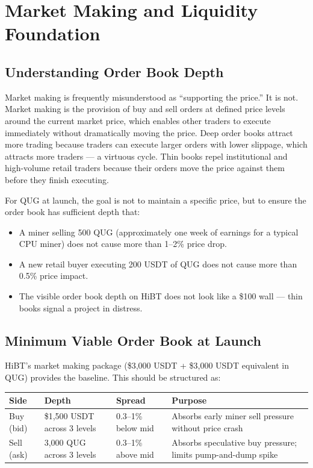 \documentclass[11pt,a4paper]{article}
\begin{document}
\section{Market Making and Liquidity Foundation}

\subsection{Understanding Order Book Depth}

Market making is frequently misunderstood as ``supporting the price.'' It is not. Market making is the provision of buy and sell orders at defined price levels around the current market price, which enables other traders to execute immediately without dramatically moving the price. Deep order books attract more trading because traders can execute larger orders with lower slippage, which attracts more traders — a virtuous cycle. Thin books repel institutional and high-volume retail traders because their orders move the price against them before they finish executing.

For QUG at launch, the goal is not to maintain a specific price, but to ensure the order book has sufficient depth that:
\begin{itemize}[leftmargin=1.5em, itemsep=2pt]
  \item A miner selling 500 QUG (approximately one week of earnings for a typical CPU miner) does not cause more than 1--2\% price drop.
  \item A new retail buyer executing 200 USDT of QUG does not cause more than 0.5\% price impact.
  \item The visible order book depth on HiBT does not look like a \$100 wall — thin books signal a project in distress.
\end{itemize}

\subsection{Minimum Viable Order Book at Launch}

HiBT's market making package (\$3,000 USDT + \$3,000 USDT equivalent in QUG) provides the baseline. This should be structured as:

\begin{center}
\begin{tabular}{C{2cm} C{2.5cm} C{2.5cm} L{5.5cm}}
  \toprule
  \textbf{Side} & \textbf{Depth} & \textbf{Spread} & \textbf{Purpose} \\
  \midrule
  Buy (bid) & \$1,500 USDT across 3 levels & 0.3--1\% below mid & Absorbs early miner sell pressure without price crash \\
  Sell (ask) & 3,000 QUG across 3 levels & 0.3--1\% above mid & Absorbs speculative buy pressure; limits pump-and-dump spike \\
  \bottomrule
\end{tabular}
\end{center}
\end{document}
